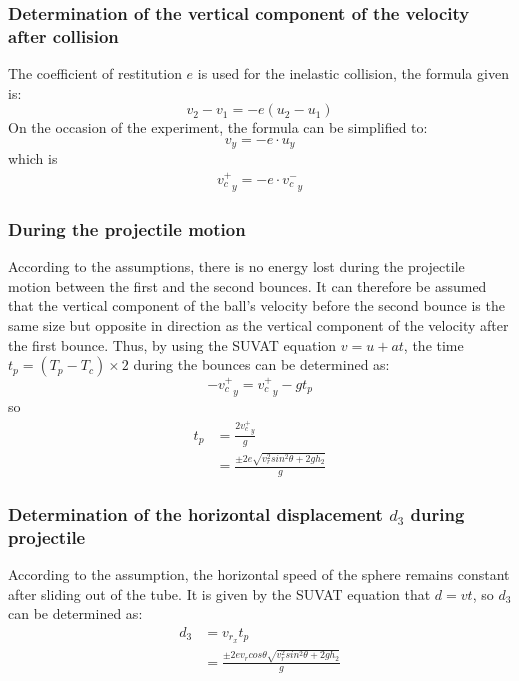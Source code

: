 \documentclass{article}
\begin{document}
        \subsubsection{Determination of the vertical component of the velocity after collision}
            The coefficient of restitution $e$ is used for the inelastic collision, the formula given is:
            \begin{equation}
                v_2 - v_1 = -e(u_2-u_1) \nonumber
            \end{equation}
            On the occasion of the experiment, the formula can be simplified to:
            \begin{equation} 
                v_y = -e\cdot u_y \nonumber
            \end{equation}
            which is 
            \begin{equation}
                \begin{aligned}
                    {v^+_c}_y = -e\cdot {v^-_c}_y
                \end{aligned}  
            \end{equation}
        \subsubsection{During the projectile motion}
        According to the assumptions, there is no energy lost during the projectile motion between the first and the second bounces. It can therefore be assumed that the vertical component of the ball's velocity before the second bounce is the same size but opposite in direction as the vertical component of the velocity after the first bounce. Thus, by using the SUVAT equation $v = u + at$, the time $t_p = (T_p - T_c)\times2 $ during the bounces can be determined as:
        $$-{v^+_c}_y = {v^+_c}_y - gt_p$$
        so 
        \begin{equation}
            \begin{aligned}
                t_p &= \frac{2{v^+_c}_y}{g}\\
                    &= \frac{\pm2e\sqrt{{v^2_{r}sin^2\theta}+2gh_2}}{g}
            \end{aligned}
        \end{equation}
        \subsubsection{Determination of the horizontal displacement $d_3$ during projectile}
        According to the assumption, the horizontal speed of the sphere remains constant after sliding out of the tube. It is given by the SUVAT equation that $d = vt$, so $d_3$ can be determined as:
        \begin{equation}
            \begin{aligned}
                d_3 &= v_{r_x}t_p\\
                &=  \frac{\pm2ev_rcos\theta\sqrt{{v^2_{r}sin^2\theta}+2gh_2}}{g}
            \end{aligned}
        \end{equation}
\end{document}
